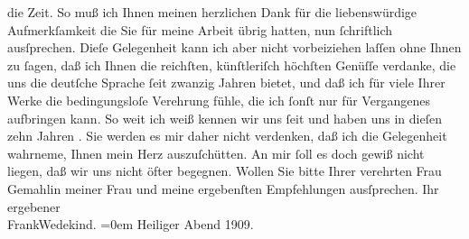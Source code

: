 \begin{ledgroupsized}[t]{13cm}
               die Zeit. So muß ich Ihnen meinen herzlichen Dank für die liebenswürdige
               Aufmerkſamkeit {\pb}die Sie für meine Arbeit
               übrig hatten, nun ſchriftlich ausſprechen. Dieſe Gelegenheit kann ich aber nicht
               vorbeiziehen laſſen ohne Ihnen zu ſagen, daß ich Ihnen die reichſten, künſtleriſch
               höchſten Genüſſe verdanke, die uns die deutſche Sprache ſeit zwanzig Jahren bietet,
               und daß ich für viele Ihrer Werke die bedingungsloſe Verehrung fühle, die ich ſonſt
               nur für Vergangenes aufbringen kann. So weit ich weiß kennen wir uns ſeit \label{K_L01909_1v}\label{K_L01909_1h} und haben
               uns in dieſen zehn Jahren {\pb}\label{K_L01909_2v}\label{K_L01909_2h}. Sie werden es mir daher nicht
               verdenken, daß ich die Gelegenheit wahrneme, Ihnen mein Herz auszuſchütten. An mir
               ſoll es doch gewiß nicht liegen, daß wir uns nicht öfter begegnen.\pend
           \pstart
           Wollen Sie bitte Ihrer verehrten Frau
                  Gemahlin meiner Frau und
               meine ergebenſten Empfehlungen ausſprechen.\pend
           \pstart
           Ihr ergebener{\\[\baselineskip]}\spacefill\mbox{FrankWedekind.}\pend
           \leftskip=0em{}\pstart
           Heiliger Abend 1909.\pend
           \endnumbering{}\end{ledgroupsized}  \newcommand{\dateiname}{L01909}\newcommand{\titel}{Frank Wedekind an Arthur Schnitzler, 24. 12. 1909}\newcommand{\editorInnen}{Martin Anton Müller und Gerd-Hermann Susen}
      